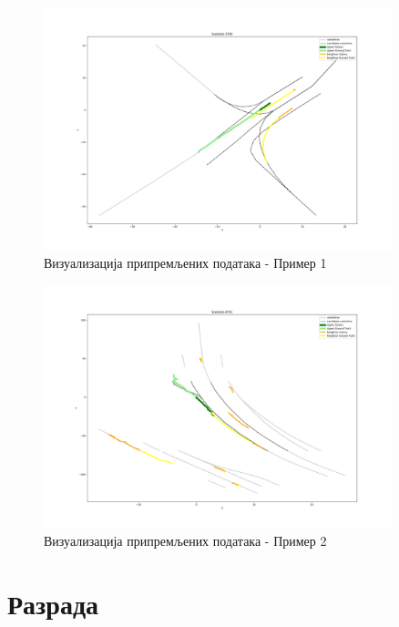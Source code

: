 \documentclass[11pt,oneside]{memoir}
\begin{document}
\begin{figure}[h!]
  \includegraphics[width=0.9\textwidth]{images/scenario3700.png}
  \caption{Визуализација припремљених података - Пример 1}
  \label{scenario-example-3700}
\end{figure}

\begin{figure}[h!]
  \includegraphics[width=0.9\textwidth]{images/scenario4791.png}
  \caption{Визуализација припремљених података - Пример 2}
  \label{scenario-example-4791}
\end{figure}


\chapter{Разрада}
\label{chp:razrada}
\end{document}
